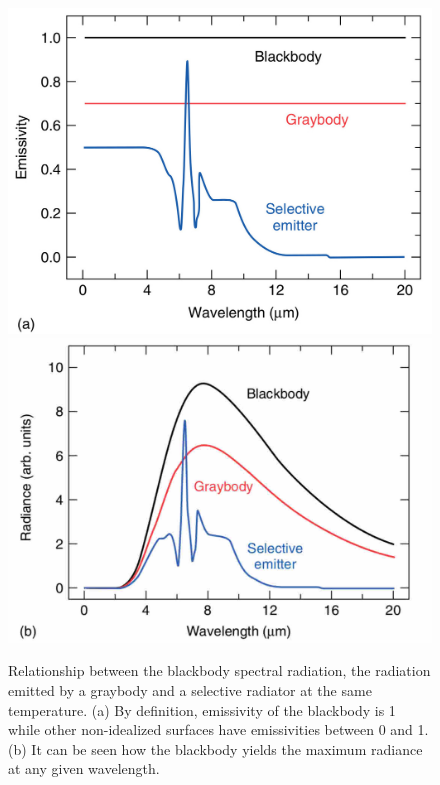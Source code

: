 		\begin{figure}[ht!]
			\centering
			\captionsetup{justification=centering,margin=2cm}
			\includegraphics[scale=0.177]{Figures/Chapter01/BlackAndGreybodyComparison02.jpg}
			\includegraphics[scale=0.28]{Figures/Chapter01/BlackAndGreybodyComparison01.jpg}
			\caption{Relationship between the blackbody spectral radiation, the radiation emitted by a graybody and a selective radiator at the same temperature. (a) By definition, emissivity of the blackbody is 1 while other non-idealized surfaces have emissivities between 0 and 1. (b) It can be seen how the blackbody yields the maximum radiance at any given wavelength.}\label{fig1.4}
		\end{figure}
		
